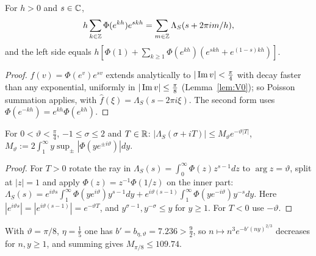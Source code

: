 \begin{lemma}\label{lem:V1}
For $h>0$ and $s\in\mathbb C$,
\[
h\sum_{k\in\mathbb Z}\Phi(e^{kh})e^{skh}=\sum_{m\in\mathbb Z}\Lambda_S(s+2\pi im/h),
\]
and the left side equals $h[\Phi(1)+\sum_{k\ge1}\Phi(e^{kh})(e^{skh}+e^{(1-s)kh})]$.
\end{lemma}

\begin{proof}
$f(v)=\Phi(e^v)e^{sv}$ extends analytically to $|\operatorname{Im} v|<\frac\pi4$ with decay faster than any exponential, uniformly in $|\operatorname{Im} v|\le\frac\pi8$ (Lemma~\ref{lem:V0}); so Poisson summation applies, with $\hat f(\xi)=\Lambda_S(s-2\pi i\xi)$. The second form uses $\Phi(e^{-kh})=e^{kh}\Phi(e^{kh})$.
\end{proof}

\begin{lemma}\label{lem:V2}
For $0<\vartheta<\frac\pi4$, $-1\le\sigma\le2$ and $T\in\mathbb R$: $|\Lambda_S(\sigma+iT)|\le M_\vartheta e^{-\vartheta|T|}$, $M_\vartheta:=2\int_1^\infty y\sup_\pm|\Phi(ye^{\pm i\vartheta})|dy$.
\end{lemma}

\begin{proof}
For $T>0$ rotate the ray in $\Lambda_S(s)=\int_0^\infty\Phi(z)z^{s-1}dz$ to $\arg z=\vartheta$, split at $|z|=1$ and apply $\Phi(z)=z^{-1}\Phi(1/z)$ on the inner part: $\Lambda_S(s)=e^{i\vartheta s}\int_1^\infty\Phi(ye^{i\vartheta})y^{s-1}dy+e^{i\vartheta(s-1)}\int_1^\infty\Phi(ye^{-i\vartheta})y^{-s}dy$. Here $|e^{i\vartheta s}|=|e^{i\vartheta(s-1)}|=e^{-\vartheta T}$, and $y^{\sigma-1},y^{-\sigma}\le y$ for $y\ge1$. For $T<0$ use $-\vartheta$.
\end{proof}

With $\vartheta=\pi/8$, $\eta=\frac15$ one has $b'=b_{\eta,\vartheta}=7.236>\frac92$, so $n\mapsto n^3e^{-b'(ny)^{2/3}}$ decreases for $n,y\ge1$, and summing gives $M_{\pi/8}\le109.74$.

